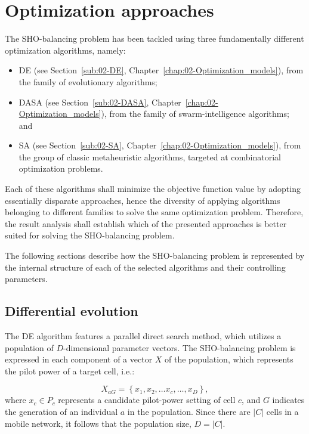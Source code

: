 \section{Optimization approaches \label{sec:07-Optimization_algorithms}}

The SHO-balancing problem has been tackled using three fundamentally
different optimization algorithms, namely:
\begin{itemize}
\item DE (see Section~\ref{sub:02-DE}, Chapter~\ref{chap:02-Optimization_models}),
from the family of evolutionary algorithms;
\item DASA (see Section~\ref{sub:02-DASA}, Chapter~\ref{chap:02-Optimization_models}),
from the family of swarm-intelligence algorithms; and
\item SA (see Section~\ref{sub:02-SA}, Chapter~\ref{chap:02-Optimization_models}),
from the group of classic metaheuristic algorithms, targeted at combinatorial
optimization problems.
\end{itemize}
Each of these algorithms shall minimize the objective function value
by adopting essentially disparate approaches, hence the diversity
of applying algorithms belonging to different families to solve the
same optimization problem. Therefore, the result analysis shall establish
which of the presented approaches is better suited for solving the
SHO-balancing problem.

The following sections describe how the SHO-balancing problem is represented
by the internal structure of each of the selected algorithms and their
controlling parameters.


\subsection{Differential evolution}

The DE algorithm features a parallel direct search method, which utilizes
a population of $D$-dimensional parameter vectors. The SHO-balancing
problem is expressed in each component of a vector $X$ of the population,
which represents the pilot power of a target cell, i.e.:

\begin{equation}
X_{aG}=\left\{ x_{1},x_{2},\ldots x_{c},\ldots,x_{D}\right\} ,\label{eq:07-DE_mapping}
\end{equation}
where $x_{c}\in P_{c}$ represents a candidate pilot-power setting
of cell $c$, and $G$ indicates the generation of an individual $a$
in the population. Since there are $|C|$ cells in a mobile network,
it follows that the population size, $D=|C|$.

